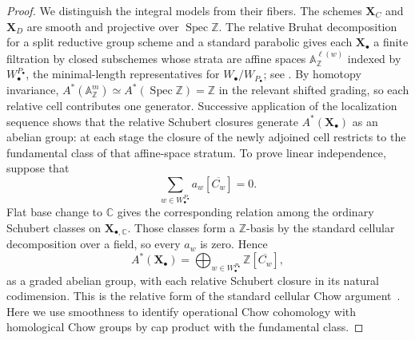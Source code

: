 \documentclass[11pt,a4paper,oneside]{amsart}
\numberwithin{equation}{section}
\theoremstyle{definition}
\theoremstyle{remark}
\begin{document}
\begin{proof}
We distinguish the integral models from their fibers.  The schemes
$\mathbf X_C$ and $\mathbf X_D$ are smooth and projective over
$\operatorname{Spec}\mathbb Z$.  The relative Bruhat decomposition for a
split reductive group scheme and a standard parabolic gives each
$\mathbf X_\bullet$ a finite filtration by closed subschemes whose strata
are affine spaces $\mathbb A^{\ell(w)}_{\mathbb Z}$ indexed by
$W_\bullet^{P_\bullet}$, the minimal-length representatives for
$W_\bullet/W_{P_\bullet}$; see
\cite[Expos\'e~XXVI, \S5]{SGA3}.  By homotopy invariance,
$A^*(\mathbb A^m_{\mathbb Z})\simeq
A^*(\operatorname{Spec}\mathbb Z)=\mathbb Z$ in the relevant shifted
grading, so each relative cell contributes one generator.  Successive
application of the localization sequence shows that the relative Schubert
closures generate $A^*(\mathbf X_\bullet)$ as an abelian group: at each
stage the closure of the newly adjoined cell restricts to the fundamental
class of that affine-space stratum.  To prove linear independence, suppose
that
\[
  \sum_{w\in W_\bullet^{P_\bullet}}
  a_w[\overline{C_w}]=0.
\]
Flat base change to $\mathbb C$ gives the corresponding relation among the
ordinary Schubert classes on $\mathbf X_{\bullet,\mathbb C}$.  Those
classes form a $\mathbb Z$-basis by the standard cellular decomposition
over a field, so every $a_w$ is zero.  Hence
\begin{equation}
\label{appA:eq:relative-cellular-Chow}
 A^*(\mathbf X_\bullet)
 =\bigoplus_{w\in W_\bullet^{P_\bullet}}\mathbb Z[\overline{C_w}],
\end{equation}
as a graded abelian group, with each relative Schubert closure in its
natural codimension.  This is the relative form of the standard cellular
Chow argument~\cite[Sections~1.8--1.9, especially Example~1.9.1]{FultonIT}.
Here we use smoothness to identify operational Chow cohomology with
homological Chow groups by cap product with the fundamental class.


\end{proof}
\end{document}
